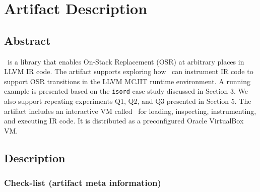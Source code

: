 
%
%



\appendix
\section{Artifact Description}


\subsection{Abstract}

\osrkit\ is a library that enables On-Stack Replacement (OSR) at arbitrary places in LLVM IR code. The artifact supports exploring how \osrkit\ can instrument IR code to support OSR transitions in the LLVM MCJIT runtime environment. A running example is presented based on the \texttt{isord} case study discussed in Section 3. We also support repeating experiments Q1, Q2, and Q3 presented in Section 5. The artifact includes an interactive VM called \tinyvm\ for loading, inspecting, instrumenting, and executing IR code. It is distributed as a preconfigured Oracle VirtualBox VM.


\subsection{Description}

\subsubsection{Check-list (artifact meta information)}


